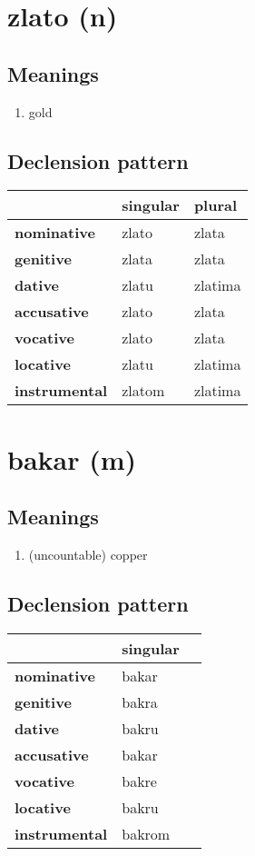 \filbreak
\section{zlato (n)}
\subsection*{Meanings}
\begin{enumerate}
\item gold
\end{enumerate}
\subsection*{Declension pattern}
\begin{tabularx}{\linewidth}{Xll}
\toprule
{} & singular &   plural \\
\midrule
\textbf{nominative  } &    zlato &    zlata \\
\textbf{genitive    } &    zlata &    zlata \\
\textbf{dative      } &    zlatu &  zlatima \\
\textbf{accusative  } &    zlato &    zlata \\
\textbf{vocative    } &    zlato &    zlata \\
\textbf{locative    } &    zlatu &  zlatima \\
\textbf{instrumental} &   zlatom &  zlatima \\
\bottomrule
\end{tabularx}

\filbreak
\section{bakar (m)}
\subsection*{Meanings}
\begin{enumerate}
\item (uncountable) copper
\end{enumerate}
\subsection*{Declension pattern}
\begin{tabularx}{\linewidth}{Xll}
\toprule
{} & singular \\
\midrule
\textbf{nominative  } &    bakar \\
\textbf{genitive    } &    bakra \\
\textbf{dative      } &    bakru \\
\textbf{accusative  } &    bakar \\
\textbf{vocative    } &    bakre \\
\textbf{locative    } &    bakru \\
\textbf{instrumental} &   bakrom \\
\bottomrule
\end{tabularx}

